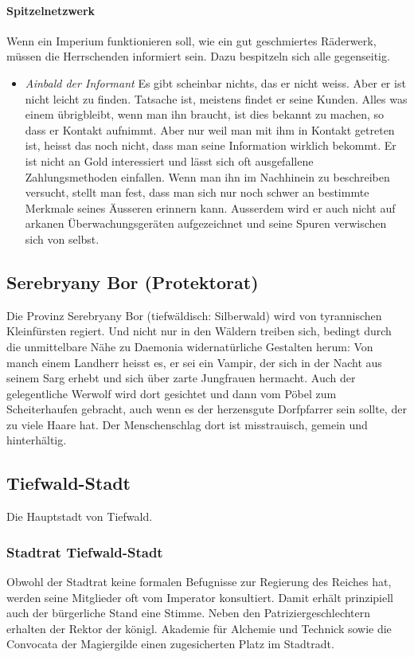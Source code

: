 \documentclass[10pt,twoside,twocolumn,openany]{book}
\begin{document}
\paragraph{Spitzelnetzwerk} Wenn ein Imperium funktionieren soll, wie ein gut geschmiertes Räderwerk, müssen die Herrschenden informiert sein. Dazu bespitzeln sich alle gegenseitig.
\begin{itemize}
	\item\textit{Ainbald der Informant} Es gibt scheinbar nichts, das er nicht weiss. Aber er ist nicht leicht zu finden. Tatsache ist, meistens findet er seine Kunden. Alles was einem übrigbleibt, wenn man ihn braucht, ist dies bekannt zu machen, so dass er Kontakt aufnimmt. Aber nur weil man mit ihm in Kontakt getreten ist, heisst das noch nicht, dass man seine Information wirklich bekommt. Er ist nicht an Gold interessiert und lässt sich oft ausgefallene Zahlungsmethoden einfallen.
	Wenn man ihn im Nachhinein zu beschreiben versucht, stellt man fest, dass man sich nur noch schwer an bestimmte Merkmale seines Äusseren erinnern kann. Ausserdem wird er auch nicht auf arkanen Überwachungsgeräten aufgezeichnet und seine Spuren verwischen sich von selbst.
\end{itemize}

\subsection{Serebryany Bor (Protektorat)}
Die Provinz Serebryany Bor (tiefwäldisch: Silberwald) wird von tyrannischen Kleinfürsten regiert. Und nicht nur in den Wäldern treiben sich, bedingt durch die unmittelbare Nähe zu Daemonia widernatürliche Gestalten herum: Von manch einem Landherr heisst es, er sei ein Vampir, der sich in der Nacht aus seinem Sarg erhebt und sich über zarte Jungfrauen hermacht. Auch der gelegentliche Werwolf wird dort gesichtet und dann vom Pöbel zum Scheiterhaufen gebracht, auch wenn es der herzensgute Dorfpfarrer sein sollte, der zu viele Haare hat. Der Menschenschlag dort ist misstrauisch, gemein und hinterhältig.

\subsection{Tiefwald-Stadt}

Die Hauptstadt von Tiefwald.

\subsubsection{Stadtrat Tiefwald-Stadt} Obwohl der Stadtrat keine formalen Befugnisse zur Regierung des Reiches hat, werden seine Mitglieder oft vom Imperator konsultiert. Damit erhält prinzipiell auch der bürgerliche Stand eine Stimme. Neben den Patriziergeschlechtern erhalten der Rektor der königl. Akademie für Alchemie und Technick sowie die Convocata der Magiergilde einen zugesicherten Platz im Stadtradt.
\end{document}
